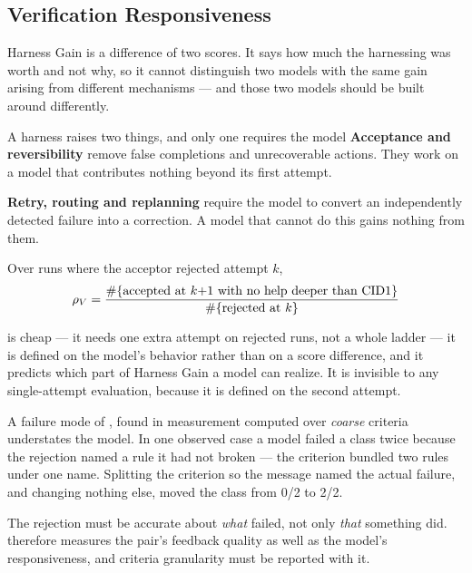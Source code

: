 \subsection{Verification Responsiveness \texorpdfstring{\rhov{}}{rho-V}}\label{sec:rhov}

Harness Gain is a difference of two scores. It says how much the harnessing was worth and not why, so it cannot distinguish two models with the same gain arising from different mechanisms --- and those two models should be built around differently.

\begin{claimbox}{A harness raises two things, and only one requires the model}
\textbf{Acceptance and reversibility} remove false completions and unrecoverable actions. They work on a model that contributes nothing beyond its first attempt.

\textbf{Retry, routing and replanning} require the model to convert an independently detected failure into a correction. A model that cannot do this gains nothing from them.
\end{claimbox}

\begin{definition}
Over runs where the acceptor rejected attempt $k$,
\begin{equation*}
\rho_V{} = \frac{\#\{\text{accepted at } k{+}1 \text{ with no help deeper than CID1}\}}{\#\{\text{rejected at } k\}}
\end{equation*}
\end{definition}

\rhov{} is cheap --- it needs one extra attempt on rejected runs, not a whole ladder --- it is defined on the model's behavior rather than on a score difference, and it predicts which part of Harness Gain a model can realize. It is invisible to any single-attempt evaluation, because it is defined on the second attempt.

\begin{cautionbox}{A failure mode of \rhov{}, found in measurement}
\rhov{} computed over \emph{coarse} criteria understates the model. In one observed case a model failed a class twice because the rejection named a rule it had not broken --- the criterion bundled two rules under one name. Splitting the criterion so the message named the actual failure, and changing nothing else, moved the class from 0/2 to 2/2.

The rejection must be accurate about \emph{what} failed, not only \emph{that} something did. \rhov{} therefore measures the pair's feedback quality as well as the model's responsiveness, and criteria granularity must be reported with it.
\end{cautionbox}


